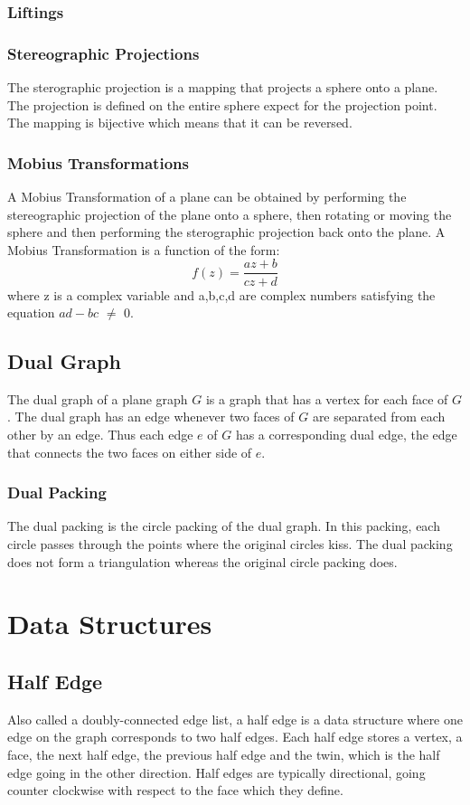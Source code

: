 \documentclass{article}
\begin{document}
\subsubsection{Liftings}
\subsubsection{Stereographic Projections}
The sterographic projection is a mapping that projects a sphere onto a plane. The projection is defined on the entire sphere expect for the projection point. The mapping is bijective which means that it can be reversed.
\subsubsection{Mobius Transformations}
A Mobius Transformation of a plane can be obtained by performing the stereographic projection of the plane onto a sphere, then rotating or moving the sphere and then performing the sterographic projection back onto the plane. A Mobius Transformation is a function of the form:
\begin{equation} 
f(z) = \frac{az+b}{cz+d}
\end{equation}
where z is a complex variable and a,b,c,d are complex numbers satisfying the equation $ad - bc$ $\neq$ $0$. 
\subsection{Dual Graph}
The dual graph of a plane graph $G$ is a graph that has a vertex for each face of $G$. The dual graph has an edge whenever two faces of $G$ are separated from each other by an edge. Thus each edge $e$ of $G$ has a corresponding dual edge, the edge that connects the two faces on either side of $e$. 
\subsubsection{Dual Packing}
The dual packing is the circle packing of the dual graph. In this packing, each circle passes through the points where the original circles kiss. The dual packing does not form a triangulation whereas the original circle packing does.
\section{Data Structures}
\subsection{Half Edge}
Also called a doubly-connected edge list, a half edge is a data structure where one edge on the graph corresponds to two half edges. Each half edge stores a vertex, a face, the next half edge, the previous half edge and the twin, which is the half edge going in the other direction. Half edges are typically directional, going counter clockwise with respect to the face which they define.


\end{document}
